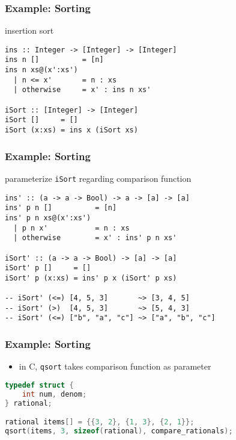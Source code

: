 \documentclass[dvipsnames]{beamer}
\theoremstyle{plain}
\begin{document}
\begin{frame}[fragile]
  \frametitle{Example: Sorting}

  \begin{exampleblock}{insertion sort}
    \begin{lstlisting}
ins :: Integer -> [Integer] -> [Integer]
ins n []          = [n]
ins n xs@(x':xs')
  | n <= x'       = n : xs
  | otherwise     = x' : ins n xs'

iSort :: [Integer] -> [Integer]
iSort []     = []
iSort (x:xs) = ins x (iSort xs)
    \end{lstlisting}
  \end{exampleblock}
\end{frame}

\begin{frame}[fragile]
  \frametitle{Example: Sorting}

  \begin{exampleblock}{parameterize \lstinline|iSort| regarding comparison
      function}
    \begin{lstlisting}
ins' :: (a -> a -> Bool) -> a -> [a] -> [a]
ins' p n []          = [n]
ins' p n xs@(x':xs')
  | p n x'           = n : xs
  | otherwise        = x' : ins' p n xs'

iSort' :: (a -> a -> Bool) -> [a] -> [a]
iSort' p []     = []
iSort' p (x:xs) = ins' p x (iSort' p xs)

-- iSort' (<=) [4, 5, 3]       ~> [3, 4, 5]
-- iSort' (>)  [4, 5, 3]       ~> [5, 4, 3]
-- iSort' (<=) ["b", "a", "c"] ~> ["a", "b", "c"]
    \end{lstlisting}
  \end{exampleblock}
\end{frame}

\begin{frame}[fragile]
  \frametitle{Example: Sorting}

  \begin{exampleblock}{}
    \begin{itemize}
      \item in C, \lstinline[language=C]{qsort} takes comparison function
        as parameter
    \end{itemize}

    \begin{lstlisting}[language=C]
typedef struct {
    int num, denom;
} rational;

rational items[] = {{3, 2}, {1, 3}, {2, 1}};
qsort(items, 3, sizeof(rational), compare_rationals);
    \end{lstlisting}
  \end{exampleblock}
\end{frame}
\end{document}
